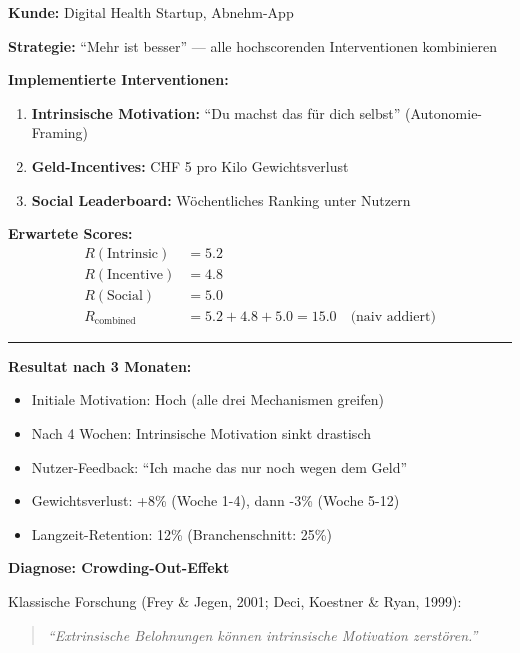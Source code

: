 \begin{tcolorbox}[colback=red!3!white, colframe=red!60!black,
    title=\textbf{Case Study 5: Der Gesundheitsanbieter und der Crowding-Out-Effekt}]

\textbf{Kunde:} Digital Health Startup, Abnehm-App

\textbf{Strategie:} ``Mehr ist besser'' --- alle hochscorenden Interventionen kombinieren

\textbf{Implementierte Interventionen:}
\begin{enumerate}[nosep]
    \item \textbf{Intrinsische Motivation:} ``Du machst das für dich selbst'' (Autonomie-Framing)
    \item \textbf{Geld-Incentives:} CHF 5 pro Kilo Gewichtsverlust
    \item \textbf{Social Leaderboard:} Wöchentliches Ranking unter Nutzern
\end{enumerate}

\textbf{Erwartete Scores:}
\begin{align*}
R(\text{Intrinsic}) &= 5.2 \\
R(\text{Incentive}) &= 4.8 \\
R(\text{Social}) &= 5.0 \\
R_{\text{combined}} &= 5.2 + 4.8 + 5.0 = 15.0 \quad \text{(naiv addiert)}
\end{align*}

\medskip
\hrule
\medskip

\textbf{Resultat nach 3 Monaten:}
\begin{itemize}[nosep]
    \item Initiale Motivation: Hoch (alle drei Mechanismen greifen)
    \item Nach 4 Wochen: Intrinsische Motivation sinkt drastisch
    \item Nutzer-Feedback: ``Ich mache das nur noch wegen dem Geld''
    \item Gewichtsverlust: +8\% (Woche 1-4), dann -3\% (Woche 5-12)
    \item Langzeit-Retention: 12\% (Branchenschnitt: 25\%)
\end{itemize}

\textbf{Diagnose: Crowding-Out-Effekt}

Klassische Forschung (Frey \& Jegen, 2001; Deci, Koestner \& Ryan, 1999):
\begin{quote}
\textit{``Extrinsische Belohnungen können intrinsische Motivation zerstören.''}
\end{quote}


\end{tcolorbox}
